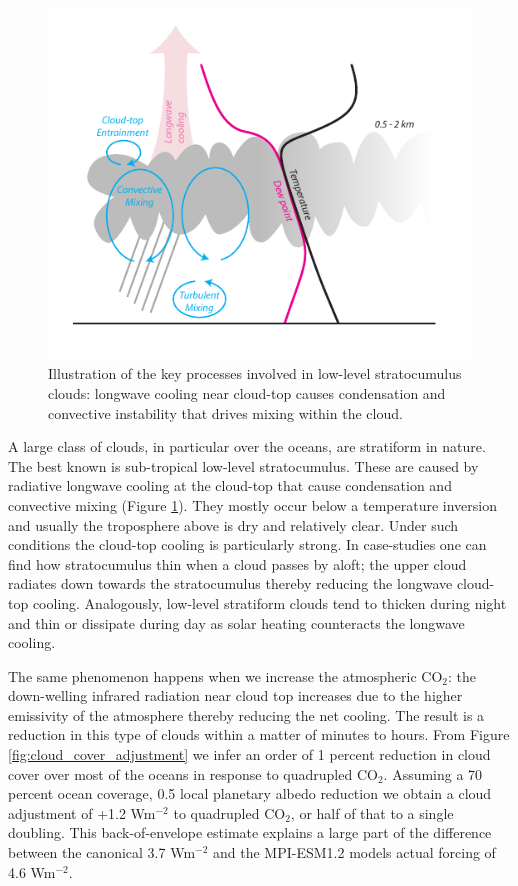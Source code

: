\documentclass[12pt]{book}
\begin{document}
\begin{figure}
\begin{center}
\includegraphics[width=12 cm]{../illustrations/Stratocumulus_dynamics.pdf}
\end{center}
\caption{ Illustration of the key processes involved in low-level stratocumulus clouds: longwave cooling near cloud-top causes condensation and convective instability that drives mixing within the cloud. } 
\label{fig:stratocumulus_dynamics}
\end{figure}

A large class of clouds, in particular over the oceans, are stratiform in nature. The best known is sub-tropical low-level stratocumulus. These are caused by radiative longwave cooling at the cloud-top that cause condensation and convective mixing (Figure \ref{fig:stratocumulus_dynamics}). They mostly occur below a temperature inversion and usually the troposphere above is dry and relatively clear. Under such conditions the cloud-top cooling is particularly strong. In case-studies one can find how stratocumulus thin when a cloud passes by aloft; the upper cloud radiates down towards the stratocumulus thereby reducing the longwave cloud-top cooling. Analogously, low-level stratiform clouds tend to thicken during night and thin or dissipate during day as solar heating counteracts the longwave cooling.

The same phenomenon happens when we increase the atmospheric CO$_2$: the down-welling infrared radiation near cloud top increases due to the higher emissivity of the atmosphere thereby reducing the net cooling. The result is a reduction in this type of clouds within a matter of minutes to hours. From Figure \ref{fig:cloud_cover_adjustment} we infer an order of 1 percent reduction in cloud cover over most of the oceans in response to quadrupled CO$_2$. Assuming a 70 percent ocean coverage, 0.5 local planetary albedo reduction we obtain a cloud adjustment of +1.2 Wm$^{-2}$ to quadrupled CO$_2$, or half of that to a single doubling. This back-of-envelope estimate explains a large part of the difference between the canonical 3.7 Wm$^{-2}$ and the MPI-ESM1.2 models actual forcing of 4.6 Wm$^{-2}$. 
\end{document}
